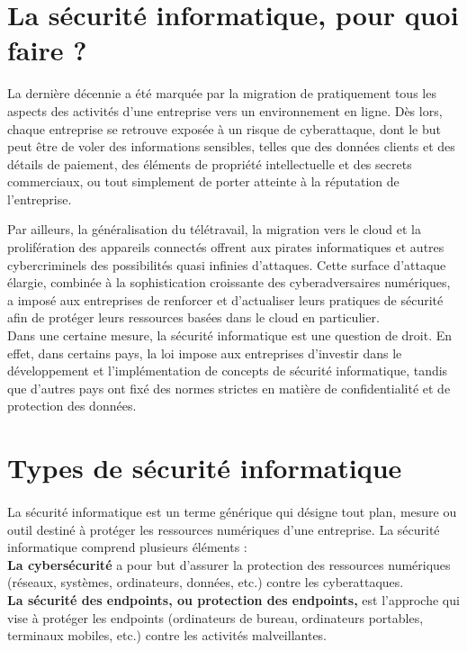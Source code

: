  
 \section{La sécurité informatique, pour quoi faire ?}
 La dernière décennie a été marquée par la migration de pratiquement tous les aspects des activités d’une entreprise vers un environnement en ligne. Dès lors, chaque entreprise se retrouve exposée à un risque de cyberattaque, dont le but peut être de voler des informations sensibles, telles que des données clients et des détails de paiement, des éléments de propriété intellectuelle et des secrets commerciaux, ou tout simplement de porter atteinte à la réputation de l’entreprise.\pagebreak

 Par ailleurs, la généralisation du télétravail, la migration vers le cloud et la prolifération des appareils connectés offrent aux pirates informatiques et autres cybercriminels des possibilités quasi infinies d’attaques. Cette surface d’attaque élargie, combinée à la sophistication croissante des cyberadversaires numériques, a imposé aux entreprises de renforcer et d’actualiser leurs pratiques de sécurité afin de protéger leurs ressources basées dans le cloud en particulier.\\
 
 Dans une certaine mesure, la sécurité informatique est une question de droit. En effet, dans certains pays, la loi impose aux entreprises d’investir dans le développement et l’implémentation de concepts de sécurité informatique, tandis que d’autres pays ont fixé des normes strictes en matière de confidentialité et de protection des données.
 \section{Types de sécurité informatique}
 \paragraph{ }
 La sécurité informatique est un terme générique qui désigne tout plan, mesure ou outil destiné à protéger les ressources numériques d’une entreprise. La sécurité informatique comprend plusieurs éléments :\\
 
 \textbf{La cybersécurité} a pour but d’assurer la protection des ressources numériques (réseaux, systèmes, ordinateurs, données, etc.) contre les cyberattaques.\\
 
 \textbf{La sécurité des endpoints, ou protection des endpoints,} est l’approche qui vise à protéger les endpoints (ordinateurs de bureau, ordinateurs portables, terminaux mobiles, etc.) contre les activités malveillantes.\\
 
